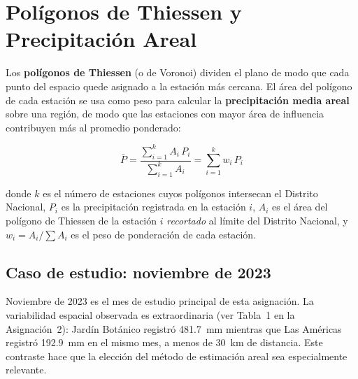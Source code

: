 \documentclass[11pt]{article}
\begin{document}
\section{Polígonos de Thiessen y Precipitación Areal}

Los \textbf{polígonos de Thiessen} (o de Voronoi) dividen el plano de modo que
cada punto del espacio quede asignado a la estación más cercana.
El área del polígono de cada estación se usa como peso para calcular la
\textbf{precipitación media areal} sobre una región, de modo que las estaciones
con mayor área de influencia contribuyen más al promedio ponderado:

\begin{equation}
  \bar{P} = \frac{\sum\limits_{i=1}^{k} A_i \, P_i}{\sum\limits_{i=1}^{k} A_i} = \sum_{i=1}^{k} w_i \, P_i
  \label{eq:thiessen}
\end{equation}

donde $k$ es el número de estaciones cuyos polígonos intersecan el Distrito Nacional,
$P_i$ es la precipitación registrada en la estación $i$,
$A_i$ es el área del polígono de Thiessen de la estación $i$ \emph{recortado}
al límite del Distrito Nacional, y $w_i = A_i / \sum A_i$ es el peso de ponderación
de cada estación.

\subsection*{Caso de estudio: noviembre de 2023}

Noviembre de 2023 es el mes de estudio principal de esta asignación.
La variabilidad espacial observada es extraordinaria (ver Tabla~1 en la
Asignación~2): Jardín Botánico registró 481.7~mm mientras que Las Américas
registró 192.9~mm en el mismo mes, a menos de 30~km de distancia.
Este contraste hace que la elección del método de estimación areal sea
especialmente relevante.

\end{document}

